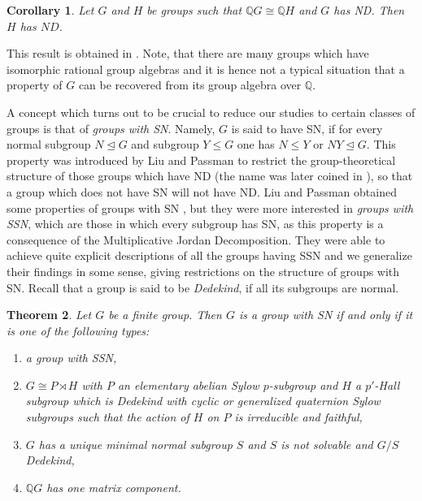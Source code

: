\documentclass[a4paper,10pt]{amsart}
\newtheorem{maintheorem}{Theorem}
\newtheorem{maincorollary}[maintheorem]{Corollary}
\theoremstyle{definition}
\theoremstyle{remark}
\newcommand{\Q}{{\mathbb Q}}
\begin{document}
\begin{maincorollary}\label{cor:QGKnowsND}
Let $G$ and $H$ be groups such that $\mathbb{Q}G \cong \mathbb{Q}H$ and $G$ has ND. Then $H$ has $ND$.
\end{maincorollary} 
This result is obtained in . Note, that there are many groups which have isomorphic rational group algebras \cite[Theorem 14.1.11]{PassmanAlgebraicStructure} and it is hence not a typical situation that a property of $G$ can be recovered from its group algebra over $\Q$.

A concept which turns out to be crucial to reduce our studies to certain classes of groups is that of \emph{groups with SN}. Namely, $G$ is said to have SN, if for every normal subgroup $N \unlhd G$ and subgroup $Y \leq G$ one has $N \leq Y$ or $NY \unlhd G$. This property was introduced by Liu and Passman to restrict the group-theoretical structure of those groups which have ND \cite{LiuPassman09} (the name was later coined in \cite{Liu}), so that a group which does not have SN will not have ND. Liu and Passman obtained some properties of groups with SN \cite{LiuPassman16}, but they were more interested in \emph{groups with SSN}, which are those in which every subgroup has SN, as this property is a consequence of the Multiplicative Jordan Decomposition. They were able to achieve quite explicit descriptions of all the groups having SSN and we generalize their findings in some sense, giving restrictions on the structure of groups with SN. Recall that a group is said to be \emph{Dedekind}, if all its subgroups are normal.

\begin{maintheorem}\label{Summary theorem for SN}
Let $G$ be a finite group. Then $G$ is a group with SN if and only if it is one of the following types:
\begin{enumerate}
\item[(i)] a group with SSN,
\item[(ii)] $G \cong P \rtimes H$ with $P$ an elementary abelian Sylow $p$-subgroup and $H$ a $p'$-Hall subgroup which is Dedekind with cyclic or generalized quaternion Sylow subgroups such that the action of $H$ on $P$ is irreducible and faithful,
\item[(iii)] $G$ has a unique minimal normal subgroup $S$ and $S$ is not solvable and $G/S$ Dedekind,
\item[(iv)] $\Q G$ has one matrix component.
\end{enumerate}
\end{maintheorem}
 
\end{document}
